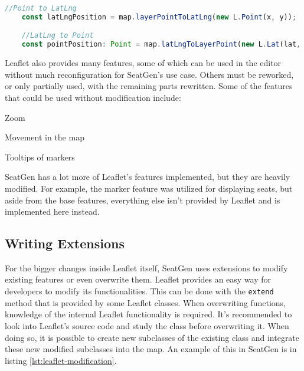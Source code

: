 \begin{lstlisting}[language=TypeScript, caption={Latitude Longitude and Point conversion}, label={lst:latlng-point}]
    //Point to LatLng
    const latLngPosition = map.layerPointToLatLng(new L.Point(x, y));

    //LatLng to Point
    const pointPosition: Point = map.latLngToLayerPoint(new L.Lat(lat, lng));
\end{lstlisting}

Leaflet also provides many features, some of which can be used in the editor without much reconfiguration for SeatGen's use case. Others must be reworked, or only partially used, with the remaining parts rewritten. Some of the features that could be used without modification include:
\begin{compactitem}
\item Zoom
\item Movement in the map
\item Tooltips of markers
\end{compactitem} 

SeatGen has a lot more of Leaflet's features implemented, but they are heavily modified. For example, the marker feature was utilized for displaying seats, but aside from the base features, everything else isn't provided by Leaflet and is implemented here instead.

\subsection{Writing Extensions}
For the bigger changes inside Leaflet itself, SeatGen uses extensions to modify existing features or even overwrite them. Leaflet provides an easy way for developers to modify its functionalities. This can be done with the \texttt{extend} method that is provided by some Leaflet classes. When overwriting functions, knowledge of the internal Leaflet functionality is required. It's recommended to look into Leaflet's source code and study the class before overwriting it. When doing so, it is possible to create new subclasses of the existing class and integrate these new modified subclasses into the map. An example of this in SeatGen is in listing \ref{lst:leaflet-modification}.

